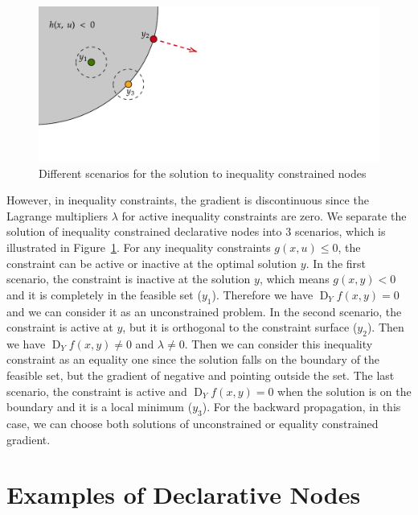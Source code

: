 \begin{figure}
    \label{fig:regular-point}
    \centering
    \includegraphics[]{figs/non-regular-scenario.pdf}
    \caption{Different scenarios for the solution to inequality constrained nodes}
\end{figure}

\par However, in inequality constraints, the gradient is discontinuous since the Lagrange multipliers $\lambda$ for active inequality constraints are zero. We separate the solution of inequality constrained declarative nodes into 3 scenarios, which is illustrated in Figure~\ref{fig:regular-point}. For any inequality constraints $g(x, u) \leq 0$, the constraint can be active or inactive at the optimal solution $y$. In the first scenario, the constraint is inactive at the solution $y$, which means $g(x,y) < 0$ and it is completely in the feasible set ($y_1$). Therefore we have $\operatorname{D}_Yf(x,y) = 0$ and we can consider it as an unconstrained problem. In the second scenario, the constraint is active at $y$, but it is orthogonal to the constraint surface ($y_2$). Then we have $\operatorname{D}_Yf(x,y) \neq 0$ and $\lambda \neq 0$. Then we can consider this inequality constraint as an equality one since the solution falls on the boundary of the feasible set, but the gradient of negative and pointing outside the set. The last scenario, the constraint is active and $\operatorname{D}_Yf(x,y) = 0$ when the solution is on the boundary and it is a local minimum ($y_3$). For the backward propagation, in this case, we can choose both solutions of unconstrained or equality constrained gradient. 

\section{Examples of Declarative Nodes}
\label{sec:example}
